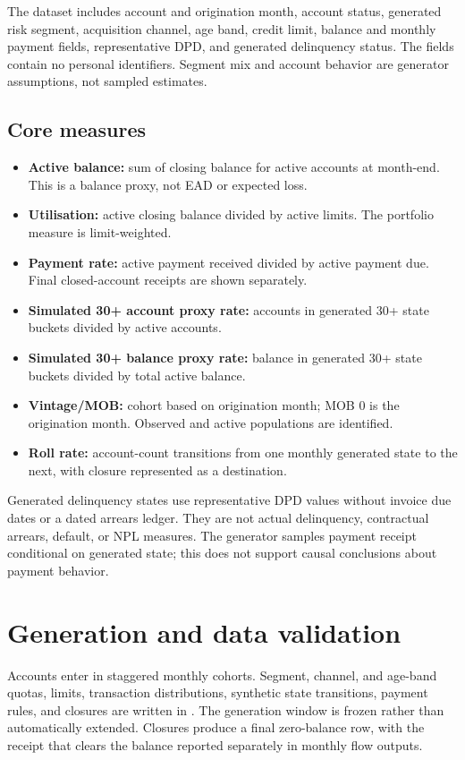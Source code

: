 \documentclass[11pt]{article}
\begin{document}
The dataset includes account and origination month, account status, generated risk segment, acquisition channel, age band, credit limit, balance and monthly payment fields, representative DPD, and generated delinquency status. The fields contain no personal identifiers. Segment mix and account behavior are generator assumptions, not sampled estimates.

\subsection{Core measures}

\begin{itemize}
\item \textbf{Active balance:} sum of closing balance for active accounts at month-end. This is a balance proxy, not EAD or expected loss.
\item \textbf{Utilisation:} active closing balance divided by active limits. The portfolio measure is limit-weighted.
\item \textbf{Payment rate:} active payment received divided by active payment due. Final closed-account receipts are shown separately.
\item \textbf{Simulated 30+ account proxy rate:} accounts in generated 30+ state buckets divided by active accounts.
\item \textbf{Simulated 30+ balance proxy rate:} balance in generated 30+ state buckets divided by total active balance.
\item \textbf{Vintage/MOB:} cohort based on origination month; MOB 0 is the origination month. Observed and active populations are identified.
\item \textbf{Roll rate:} account-count transitions from one monthly generated state to the next, with closure represented as a destination.
\end{itemize}

Generated delinquency states use representative DPD values without invoice due dates or a dated arrears ledger. They are not actual delinquency, contractual arrears, default, or NPL measures. The generator samples payment receipt conditional on generated state; this does not support causal conclusions about payment behavior.

\section{Generation and data validation}

Accounts enter in staggered monthly cohorts. Segment, channel, and age-band quotas, limits, transaction distributions, synthetic state transitions, payment rules, and closures are written in . The generation window is frozen rather than automatically extended. Closures produce a final zero-balance row, with the receipt that clears the balance reported separately in monthly flow outputs.
\end{document}
